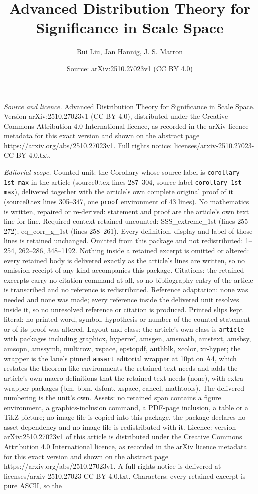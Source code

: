 \documentclass[10pt,a4paper]{amsart}
\title[Advanced Distribution Theory for Significance in Scale Space]{Advanced Distribution Theory for Significance in Scale Space}
\author{Rui Liu, Jan Hannig, J. S. Marron}
\date{Source: arXiv:2510.27023v1 (CC BY 4.0)}
\begin{document}
\maketitle

\noindent\emph{Source and licence.} Advanced Distribution Theory for Significance in Scale Space. Version arXiv:2510.27023v1 (CC BY 4.0), distributed under the Creative Commons Attribution 4.0 International licence, as recorded in the arXiv licence metadata for this exact version and shown on the abstract page https://arxiv.org/abs/2510.27023v1. Full rights notice: licenses/arxiv-2510.27023-CC-BY-4.0.txt.\par\smallskip

\noindent\textit{Editorial scope.} Counted unit: the Corollary whose source label is \texttt{corollary-1st-max} in the article (source0.tex lines 287--304, source label \texttt{corollary-1st-max}), delivered together with the article's own complete original proof of it (source0.tex lines 305--347, one \texttt{proof} environment of 43 lines). No mathematics is written, repaired or re-derived: statement and proof are the article's own text line for line. Required context retained uncounted: SSS\_extreme\_1st (lines 255--272); eq\_corr\_g\_1st (lines 258--261). Every definition, display and label of those lines is retained unchanged. Omitted from this package and not redistributed: 1--254, 262--286, 348--1192. Nothing inside a retained excerpt is omitted or altered: every retained body is delivered exactly as the article's lines are written, so no omission receipt of any kind accompanies this package. Citations: the retained excerpts carry no citation command at all, so no bibliography entry of the article is transcribed and no reference is redistributed. Reference adaptation: none was needed and none was made; every reference inside the delivered unit resolves inside it, so no unresolved reference or citation is produced. Printed slips kept literal: no printed word, symbol, hypothesis or number of the counted statement or of its proof was altered. Layout and class: the article's own class is \texttt{article} with packages including graphicx, hyperref, amsgen, amsmath, amstext, amsbsy, amsopn, amssymb, multirow, xspace, epstopdf, authblk, xcolor, xr-hyper; the wrapper is the lane's pinned \texttt{amsart} editorial wrapper at 10pt on A4, which restates the theorem-like environments the retained text needs and adds the article's own macro definitions that the retained text needs (none), with extra wrapper packages (bm, bbm, dsfont, xspace, cancel, mathtools). The delivered numbering is the unit's own. Assets: no retained span contains a figure environment, a graphics-inclusion command, a PDF-page inclusion, a table or a TikZ picture; no image file is copied into this package, the package declares no asset dependency and no image file is redistributed with it. Licence: version arXiv:2510.27023v1 of this article is distributed under the Creative Commons Attribution 4.0 International licence, as recorded in the arXiv licence metadata for this exact version and shown on the abstract page https://arxiv.org/abs/2510.27023v1. A full rights notice is delivered at licenses/arxiv-2510.27023-CC-BY-4.0.txt. Characters: every retained excerpt is pure ASCII, so the 
\end{document}
